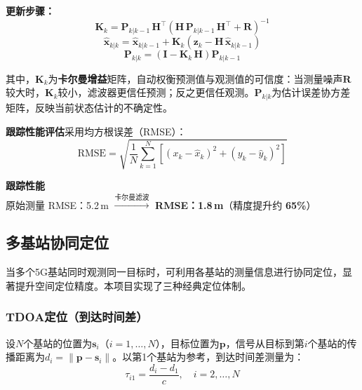 \documentclass[12pt, a4paper]{article}
\begin{document}
\textbf{更新步骤：}
\begin{equation}
  \bm{K}_k = \bm{P}_{k|k-1}\,\bm{H}^\top
  \left(\bm{H}\,\bm{P}_{k|k-1}\,\bm{H}^\top + \bm{R}\right)^{-1}
  \label{eq:kf_gain}
\end{equation}
\begin{equation}
  \hat{\bm{x}}_{k|k} = \hat{\bm{x}}_{k|k-1}
  + \bm{K}_k\!\left(\bm{z}_k - \bm{H}\,\hat{\bm{x}}_{k|k-1}\right)
  \label{eq:kf_update_state}
\end{equation}
\begin{equation}
  \bm{P}_{k|k} = \left(\bm{I} - \bm{K}_k\,\bm{H}\right)\bm{P}_{k|k-1}
  \label{eq:kf_update_cov}
\end{equation}

其中，$\bm{K}_k$为\textbf{卡尔曼增益}矩阵，自动权衡预测值与观测值的可信度：当测量噪声$\bm{R}$较大时，$\bm{K}_k$较小，滤波器更信任预测；反之更信任观测。$\bm{P}_{k|k}$为估计误差协方差矩阵，反映当前状态估计的不确定性。

\textbf{跟踪性能评估}采用均方根误差（RMSE）：
\begin{equation}
  \mathrm{RMSE} = \sqrt{\frac{1}{N}\sum_{k=1}^{N}
  \left[(x_k - \hat{x}_k)^2 + (y_k - \hat{y}_k)^2\right]}
  \label{eq:rmse}
\end{equation}

\begin{metricbox}
\centering
{\bfseries 跟踪性能}\\[6pt]
原始测量 RMSE：5.2\,m
\quad$\xrightarrow{\text{卡尔曼滤波}}$\quad
\textbf{RMSE：1.8\,m}（精度提升约 \textbf{65\%}）
\end{metricbox}

\subsection{多基站协同定位}
\label{sec:multistation}

当多个5G基站同时观测同一目标时，可利用各基站的测量信息进行协同定位，显著提升空间定位精度。本项目实现了三种经典定位体制。

\subsubsection{TDOA定位（到达时间差）}

设$N$个基站的位置为$\bm{s}_i$（$i=1,\ldots,N$），目标位置为$\bm{p}$，信号从目标到第$i$个基站的传播距离为$d_i = \|\bm{p} - \bm{s}_i\|$。以第1个基站为参考，到达时间差测量为：
\begin{equation}
  \tau_{i1} = \frac{d_i - d_1}{c},\quad i = 2,\ldots,N
  \label{eq:tdoa}
\end{equation}
\end{document}

